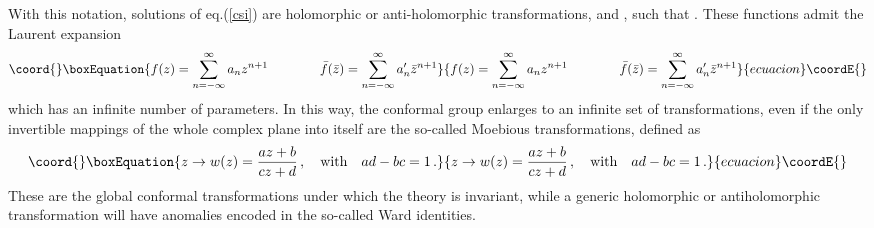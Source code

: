 \documentclass[a4paper,12pt]{report}
\begin{document}
With this notation, solutions of eq.(\ref{csi}) are holomorphic or anti-holomorphic transformations,
\coordHE{} and \coordHE{}, such that \coordHE{}.
These functions admit the Laurent expansion
\begin{equation}\coord{}\boxEquation{\label{lau}
f(z)=\sum_{n=-\infty}^{\infty}a_{n}z^{n+1} \qquad \qquad
\bar{f}(\bar{z})=\sum_{n=-\infty}^{\infty}a'_{n}\bar{z}^{n+1}
}{f(z)=\sum_{n=-\infty}^{\infty}a_{n}z^{n+1} \qquad \qquad
\bar{f}(\bar{z})=\sum_{n=-\infty}^{\infty}a'_{n}\bar{z}^{n+1}
}{ecuacion}\coordE{}\end{equation}
which has an infinite number of parameters. In this way, the conformal group enlarges to an infinite set of
transformations, even if the only invertible mappings of the whole complex plane into itself are the so-called
Moebious transformations, defined as
\begin{equation}\coord{}\boxEquation{\label{moebious}
z\rightarrow w(z)=\frac{az+b}{cz+d}\,,\quad \textrm{with} \quad ad-bc=1 \,.
}{z\rightarrow w(z)=\frac{az+b}{cz+d}\,,\quad \textrm{with} \quad ad-bc=1 \,.
}{ecuacion}\coordE{}\end{equation}
These are the global conformal transformations under which the theory is invariant, while a generic holomorphic
or antiholomorphic transformation will have anomalies encoded in the so-called Ward identities.

\vspace{0.5cm}
\end{document}
